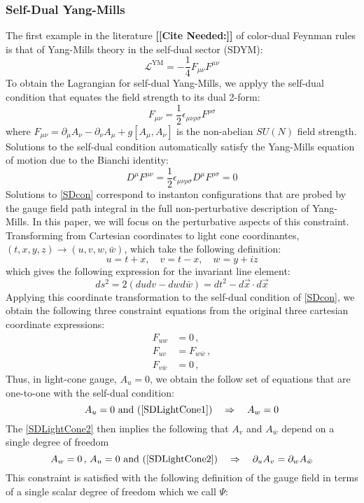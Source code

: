 \documentclass[11pt,letter]{article}
\def\be{\begin{equation}}
\def\ee{\end{equation}}
\newcommand{\citepls}[1]{{\bf\color{red}[[Cite Needed:#1]]}}
\begin{document}
\subsubsection{Self-Dual Yang-Mills} The first example in the literature \citepls{} of color-dual Feynman rules is that of Yang-Mills theory in the self-dual sector (SDYM):
\be
\mathcal{L}^{\text{YM}} = -\frac{1}{4}F_{\mu\nu}F^{\mu\nu}
\ee
To obtain the Lagrangian for self-dual Yang-Mills, we applyy the self-dual condition that equates the field strength to its dual 2-form:
\be\label{SDcon}
F_{\mu\nu} = \frac{1}{2} \epsilon_{\mu\nu\rho\sigma}F^{\rho\sigma}
\ee
where $F_{\mu\nu} = \partial_\mu A_\nu -\partial_\nu A_\mu + g[A_\mu ,A_\nu]$ is the non-abelian $SU(N)$ field strength. Solutions to the self-dual condition automatically satisfy the Yang-Mills equation of motion due to the Bianchi identity:
\be
D^\mu F^{\mu\nu} = \frac{1}{2} \epsilon_{\mu\nu\rho\sigma}D^\mu F^{\rho\sigma} = 0
\ee
Solutions to \cref{SDcon} correspond to instanton configurations that are probed by the gauge field path integral in the full non-perturbative description of Yang-Mills. In this paper, we will focus on the perturbative aspects of this constraint. Transforming from Cartesian coordinates to light cone coordinantes, $(t,x,y,z) \rightarrow (u,v,w,\bar{w})$, which take the following definition:
\be
u = t+x,\quad v=t-x, \quad w = y+iz
\ee
which gives the following expression for the invariant line element:
\be
ds^2 = 2(dudv - dwd\bar{w}) = dt^2 - d\vec{x}\cdot d\vec{x}
\ee
Applying this coordinate transformation to the self-dual condition of \cref{SDcon}, we obtain the following three constraint equations from the original three cartesian coordinate expressions:
\begin{align} \label{SDLightCone1}
F_{uw} &=0\,,
\\
 \label{SDLightCone2}
 F_{uv} &= F_{w\bar{w}}\,,
\\
 \label{SDLightCone3}
 F_{v\bar{w}} &= 0\,,
\end{align}
Thus, in light-cone gauge, $A_u=0$, we obtain the follow set of equations that are one-to-one with the self-dual condition:
\be
A_u=0 \text{ and } (\ref{SDLightCone1}) \quad\Rightarrow \quad A_w=0
\ee
The \cref{SDLightCone2} then implies the following that $A_v$ and $A_{\bar{w}}$ depend on a single degree of freedom
\be
A_w=0\,,\,A_u=0 \text{ and } (\ref{SDLightCone2}) \quad\Rightarrow \quad \partial_u A_v = \partial_w A_{\bar{w}}
\ee
This constraint is  satisfied with the following definition of the gauge field in terms of a single scalar degree of freedom which we call $\Psi$:
\end{document}
